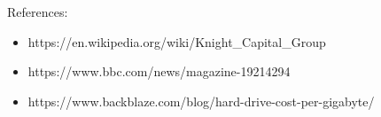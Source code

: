 \documentclass[aspectratio=169, 15pt,usenames,dvipsnames]{beamer}
\begin{document}
\begin{gdsw}
	References:
	\begin{center}\small
		\begin{itemize}
			\item https://en.wikipedia.org/wiki/Knight\_Capital\_Group
			\item https://www.bbc.com/news/magazine-19214294
			\item https://www.backblaze.com/blog/hard-drive-cost-per-gigabyte/
		\end{itemize}
	\end{center}
\end{gdsw}
    	
\end{document}
